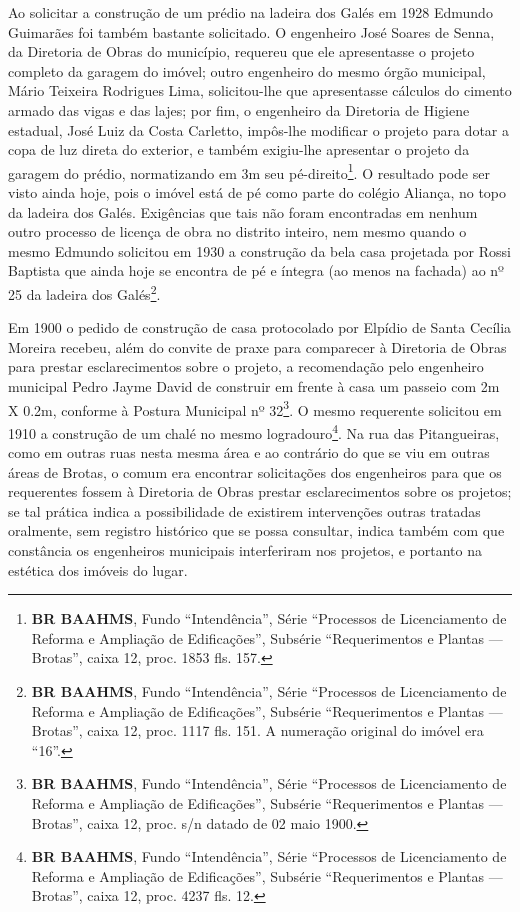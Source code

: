 Ao solicitar a construção de um prédio na ladeira dos Galés em 1928 Edmundo Guimarães foi também bastante solicitado. O engenheiro José Soares de Senna, da Diretoria de Obras do município, requereu que ele apresentasse o projeto completo da garagem do imóvel; outro engenheiro do mesmo órgão municipal, Mário Teixeira Rodrigues Lima, solicitou-lhe que apresentasse cálculos do cimento armado das vigas e das lajes; por fim, o engenheiro da Diretoria de Higiene estadual, José Luiz da Costa Carletto, impôs-lhe modificar o projeto para dotar a copa de luz direta do exterior, e também exigiu-lhe apresentar o projeto da garagem do prédio, normatizando em 3m seu pé-direito\footnote{\textbf{BR BAAHMS}, Fundo ``Intendência'', Série ``Processos de Licenciamento de Reforma e Ampliação de Edificações'', Subsérie ``Requerimentos e Plantas --- Brotas'', caixa 12, proc. 1853 fls. 157.}. O resultado pode ser visto ainda hoje, pois o imóvel está de pé como parte do colégio Aliança, no topo da ladeira dos Galés. Exigências que tais não foram encontradas em nenhum outro processo de licença de obra no distrito inteiro, nem mesmo quando o mesmo Edmundo solicitou em 1930 a construção da bela casa projetada por Rossi Baptista que ainda hoje se encontra de pé e íntegra (ao menos na fachada) ao nº 25 da ladeira dos Galés\footnote{\textbf{BR BAAHMS}, Fundo ``Intendência'', Série ``Processos de Licenciamento de Reforma e Ampliação de Edificações'', Subsérie ``Requerimentos e Plantas --- Brotas'', caixa 12, proc. 1117 fls. 151. A numeração original do imóvel era ``16''.}.

Em 1900 o pedido de construção de casa protocolado por Elpídio de Santa Cecília Moreira recebeu, além do convite de praxe para comparecer à Diretoria de Obras para prestar esclarecimentos sobre o projeto, a recomendação pelo engenheiro municipal Pedro Jayme David de construir em frente à casa um passeio com 2m X 0.2m, conforme à Postura Municipal nº 32\footnote{\textbf{BR BAAHMS}, Fundo ``Intendência'', Série ``Processos de Licenciamento de Reforma e Ampliação de Edificações'', Subsérie ``Requerimentos e Plantas --- Brotas'', caixa 12, proc. s/n datado de 02 maio 1900.}. O mesmo requerente solicitou em 1910 a construção de um chalé no mesmo logradouro\footnote{\textbf{BR BAAHMS}, Fundo ``Intendência'', Série ``Processos de Licenciamento de Reforma e Ampliação de Edificações'', Subsérie ``Requerimentos e Plantas --- Brotas'', caixa 12, proc. 4237 fls. 12.}. Na rua das Pitangueiras, como em outras ruas nesta mesma área e ao contrário do que se viu em outras áreas de Brotas, o comum era encontrar solicitações dos engenheiros para que os requerentes fossem à Diretoria de Obras prestar esclarecimentos sobre os projetos; se tal prática indica a possibilidade de existirem intervenções outras tratadas oralmente, sem registro histórico que se possa consultar, indica também com que constância os engenheiros municipais interferiram nos projetos, e portanto na estética dos imóveis do lugar.

